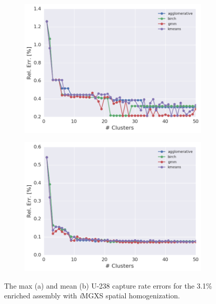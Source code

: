 \begin{figure}[h!]
\centering
\begin{subfigure}{0.9\textwidth}
  \centering
  \includegraphics[width=\linewidth]{figures/results/err-by-cluster/assm-31/max-rel-err}
  \caption{}
  \label{fig:chap11-max-capt-err-by-cluster-assm-31}
\end{subfigure}
\begin{subfigure}{0.9\textwidth}
  \centering
  \includegraphics[width=\linewidth]{figures/results/err-by-cluster/assm-31/mean-rel-err}
  \caption{}
  \label{fig:chap11-mean-capt-err-by-cluster-assm-31}
\end{subfigure}
\caption[U-238 capture rate error variation with the number of clusters]{The max (a) and mean (b) U-238 capture rate errors for the 3.1\% enriched assembly with \textit{i}\ac{MGXS} spatial homogenization.}
\label{fig:chap11-capt-err-by-cluster-assm-31}
\end{figure}

